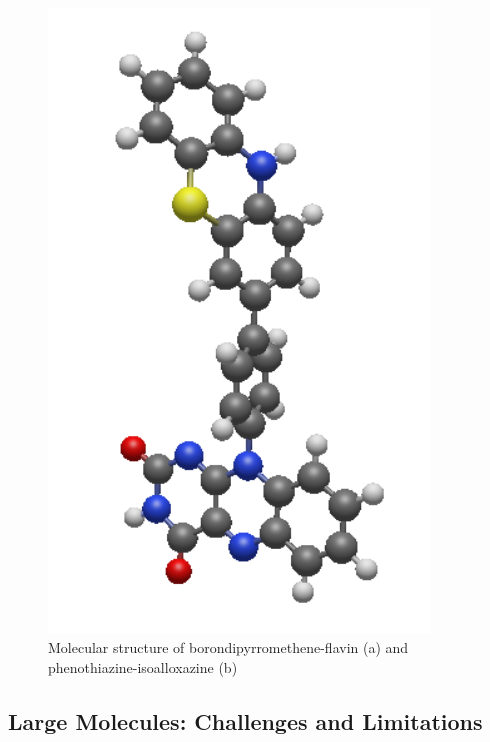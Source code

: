 \begin{figure}
\begin{minipage}{0.45\textwidth}
\includegraphics[width=0.9\textwidth]{Pics/DYAP.png}
\end{minipage}
\caption{Molecular structure of borondipyrromethene-flavin (a) and phenothiazine-isoalloxazine (b)}
\label{fig:FLVADYAP}
\end{figure}

\subsection{Large Molecules: Challenges and Limitations}

